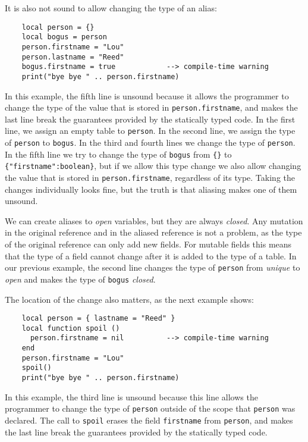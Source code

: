 It is also not sound to allow changing the type of an alias:
\begin{verbatim}
    local person = {}
    local bogus = person
    person.firstname = "Lou"
    person.lastname = "Reed"
    bogus.firstname = true            --> compile-time warning
    print("bye bye " .. person.firstname)
\end{verbatim}

In this example, the fifth line is unsound because it allows the
programmer to change the type of the value that is stored in
\texttt{person.firstname}, and makes the last line break the
guarantees provided by the statically typed code.
In the first line, we assign an empty table to \texttt{person}.
In the second line, we assign the type of \texttt{person} to
\texttt{bogus}.
In the third and fourth lines we change the type of \texttt{person}.
In the fifth line we try to change the type of \texttt{bogus}
from \texttt{\{\}} to \texttt{\{"firstname":boolean\}},
but if we allow this type change we also allow changing the value
that is stored in \texttt{person.firstname}, regardless of its type.
Taking the changes individually looks fine, but the truth is that
aliasing makes one of them unsound.

We can create aliases to \emph{open} variables, but they are always \emph{closed}.
Any mutation in the original reference and in the aliased reference
is not a problem, as the type of the original reference can only
add new fields.
For mutable fields this means that the type of a field cannot
change after it is added to the type of a table.
In our previous example, the second line changes the type of
\texttt{person} from \emph{unique} to \emph{open} and makes the type of
\texttt{bogus} \emph{closed}.

The location of the change also matters, as the next example shows:
\begin{verbatim}
    local person = { lastname = "Reed" }
    local function spoil ()
      person.firstname = nil          --> compile-time warning
    end
    person.firstname = "Lou"
    spoil()
    print("bye bye " .. person.firstname)
\end{verbatim}

In this example, the third line is unsound because this line allows
the programmer to change the type of \texttt{person} outside of the
scope that \texttt{person} was declared.
The call to \texttt{spoil} erases the field \texttt{firstname} from
\texttt{person}, and makes the last line break the guarantees
provided by the statically typed code.

